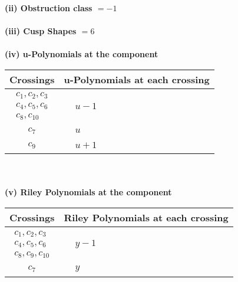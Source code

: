 \documentclass[1p]{elsarticle_modified}
\theoremstyle{definition}
\begin{document}
\flushleft \textbf{(ii) Obstruction class $= -1$}\\~\\
\flushleft \textbf{(iii) Cusp Shapes $= 6$}\\~\\
\newpage\renewcommand{\arraystretch}{1}
\flushleft \textbf{(iv) u-Polynomials at the component}\newline \\
\begin{tabular}{m{50pt}|m{274pt}}
Crossings & \hspace{64pt}u-Polynomials at each crossing \\
\hline $$\begin{aligned}c_{1},c_{2},c_{3}\\c_{4},c_{5},c_{6}\\c_{8},c_{10}\end{aligned}$$&$\begin{aligned}
&u-1
\end{aligned}$\\
\hline $$\begin{aligned}c_{7}\end{aligned}$$&$\begin{aligned}
&u
\end{aligned}$\\
\hline $$\begin{aligned}c_{9}\end{aligned}$$&$\begin{aligned}
&u+1
\end{aligned}$\\
\hline
\end{tabular}\\~\\
\newpage\renewcommand{\arraystretch}{1}
\flushleft \textbf{(v) Riley Polynomials at the component}\newline \\
\begin{tabular}{m{50pt}|m{274pt}}
Crossings & \hspace{64pt}Riley Polynomials at each crossing \\
\hline $$\begin{aligned}c_{1},c_{2},c_{3}\\c_{4},c_{5},c_{6}\\c_{8},c_{9},c_{10}\end{aligned}$$&$\begin{aligned}
&y-1
\end{aligned}$\\
\hline $$\begin{aligned}c_{7}\end{aligned}$$&$\begin{aligned}
&y
\end{aligned}$\\
\hline
\end{tabular}\\~\\
\end{document}
